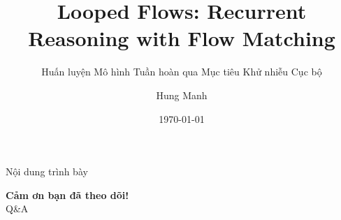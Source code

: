 \documentclass[aspectratio=169]{beamer}
\title[Looped Flows]{Looped Flows: Recurrent Reasoning with Flow Matching}
\subtitle{Huấn luyện Mô hình Tuần hoàn qua Mục tiêu Khử nhiễu Cục bộ}
\author{Hung Manh}
\date{\today}
\begin{document}
\begin{frame}
    \titlepage
\end{frame}

\begin{frame}{Nội dung trình bày}
    \tableofcontents
\end{frame}



\begin{frame}
    \centering
    \Huge \textbf{Cảm ơn bạn đã theo dõi!}\\
    \vspace{0.5cm}
    \Large Q\&A
\end{frame}
\end{document}
